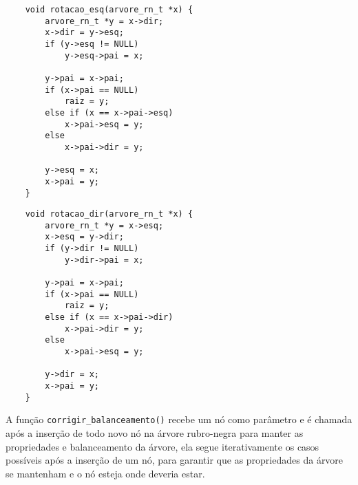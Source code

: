 \begin{lstlisting}
    void rotacao_esq(arvore_rn_t *x) {
        arvore_rn_t *y = x->dir;
        x->dir = y->esq;
        if (y->esq != NULL)
            y->esq->pai = x;

        y->pai = x->pai;
        if (x->pai == NULL)
            raiz = y;
        else if (x == x->pai->esq)
            x->pai->esq = y;
        else
            x->pai->dir = y;

        y->esq = x;
        x->pai = y;
    }
\end{lstlisting}

\begin{lstlisting}
    void rotacao_dir(arvore_rn_t *x) {
        arvore_rn_t *y = x->esq;
        x->esq = y->dir;
        if (y->dir != NULL)
            y->dir->pai = x;

        y->pai = x->pai;
        if (x->pai == NULL)
            raiz = y;
        else if (x == x->pai->dir)
            x->pai->dir = y;
        else
            x->pai->esq = y;

        y->dir = x;
        x->pai = y;
    }
\end{lstlisting}

\vspace{3mm}

A função \texttt{corrigir\_balanceamento()} recebe um nó como parâmetro e é chamada após a inserção de todo novo nó na árvore rubro-negra para manter as propriedades e balanceamento da árvore, ela segue iterativamente os casos possíveis após a inserção de um nó, para garantir que as propriedades da árvore se mantenham e o nó esteja onde deveria estar.

